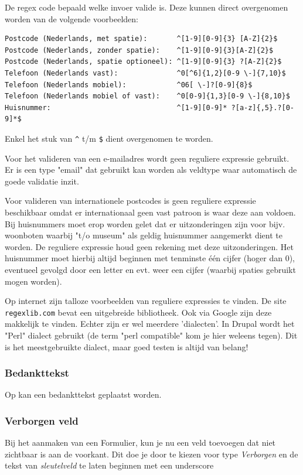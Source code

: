 De regex code bepaald welke invoer valide is. Deze kunnen direct overgenomen worden van de volgende voorbeelden:
\begin{verbatim}
Postcode (Nederlands, met spatie):       ^[1-9][0-9]{3} [A-Z]{2}$
Postcode (Nederlands, zonder spatie):    ^[1-9][0-9]{3}[A-Z]{2}$
Postcode (Nederlands, spatie optioneel): ^[1-9][0-9]{3} ?[A-Z]{2}$
Telefoon (Nederlands vast):              ^0[^6]{1,2}[0-9 \-]{7,10}$
Telefoon (Nederlands mobiel):            ^06[ \-]?[0-9]{8}$
Telefoon (Nederlands mobiel of vast):    ^0[0-9]{1,3}[0-9 \-]{8,10}$
Huisnummer:                              ^[1-9][0-9]* ?[a-z]{,5}.?[0-9]*$
\end{verbatim}
Enkel het stuk van \texttt{\^} t/m \texttt{\$} dient overgenomen te worden.

Voor het valideren van een e-mailadres wordt geen reguliere expressie gebruikt. Er is een type "email" dat gebruikt kan worden als veldtype waar automatisch de goede validatie inzit.

Voor valideren van internationele postcodes is geen reguliere expressie beschikbaar omdat er internationaal geen vast patroon is waar deze aan voldoen. Bij huisnummers moet erop worden gelet dat er uitzonderingen zijn voor bijv. woonboten waarbij "t/o museum" als geldig huisnummer aangemerkt dient te worden. De reguliere expressie houd geen rekening met deze uitzonderingen. Het huisnummer moet hierbij altijd beginnen met tenminste \'{e}\'{e}n cijfer (hoger dan 0), eventueel gevolgd door een letter en evt. weer een cijfer (waarbij spaties gebruikt mogen worden).

Op internet zijn talloze voorbeelden van reguliere expressies te vinden. De site \texttt{regexlib.com} bevat een uitgebreide bibliotheek. Ook via Google zijn deze makkelijk te vinden. Echter zijn er wel meerdere 'dialecten'. In Drupal wordt het "Perl" dialect gebruikt (de term "perl compatible" kom je hier weleens tegen). Dit is het meestgebruikte dialect, maar goed testen is altijd van belang!

\subsubsection{Bedankttekst}
Op  kan een bedankttekst geplaatst worden.


\subsubsection{Verborgen veld}
Bij het aanmaken van een Formulier, kun je nu een veld toevoegen dat niet zichtbaar is aan de voorkant. Dit doe je door te kiezen voor type \emph{Verborgen} en de tekst van \emph{sleutelveld} te laten beginnen met een underscore  

